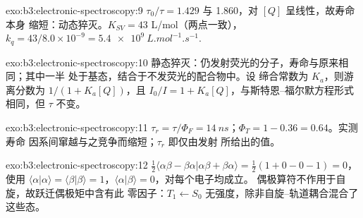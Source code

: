 \begin{solution}{exo:b3:electronic-spectroscopy:9}
$\tau_0/\tau = 1.429$ 与 1.860，对 $[Q]$ 呈线性，故寿命本身
缩短：动态猝灭。$K_{SV} = 43$ L/mol（两点一致），$k_q = 43/8.0
\times 10^{-9} = \qty{5.4e9}{L.mol^{-1}.s^{-1}}$.
\end{solution}

\begin{solution}{exo:b3:electronic-spectroscopy:10}
静态猝灭：仍发射荧光的分子，寿命与原来相同；其中一半
处于基态，结合于不发荧光的配合物中。设
缔合常数为 $K_a$，则游离分数为 $1/(1 + K_a[Q])$，且 $I_0/I = 1 +
K_a[Q]$，与斯特恩–福尔默方程形式相同，但 $\tau$ 不变。
\end{solution}

\begin{solution}{exo:b3:electronic-spectroscopy:11}
$\tau_r = \tau/\Phi_F = \qty{14}{ns}$；$\Phi_T = 1 - 0.36 = 0.64$。实测寿命
因系间窜越与之竞争而缩短；$\tau_r$ 即仅由发射
所给出的值。
\end{solution}

\begin{solution}{exo:b3:electronic-spectroscopy:12}
$\frac12\langle\alpha\beta - \beta\alpha|\alpha\beta + \beta\alpha\rangle = \frac12(1 + 0 - 0 - 1) = 0$，使用
$\langle\alpha|\alpha\rangle = \langle\beta|\beta\rangle = 1$，$\langle\alpha|\beta\rangle = 0$，对每个电子均成立。
偶极算符不作用于自旋，故跃迁偶极矩中含有此
零因子：$T_1 \leftarrow S_0$ 无强度，除非自旋–轨道耦合混合了
这些态。
\end{solution}

